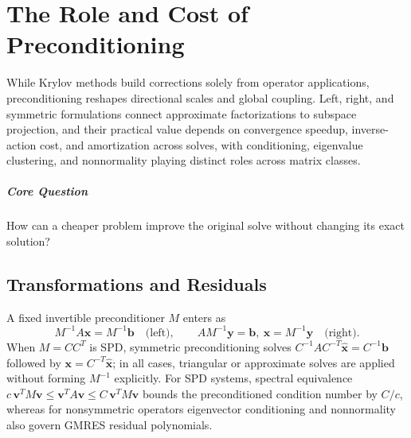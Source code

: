 \chapter{The Role and Cost of Preconditioning}\label{v0ch:16}
\begin{chaptersummary}
While Krylov methods build corrections solely from operator applications, preconditioning reshapes directional scales and global coupling. Left, right, and symmetric formulations connect approximate factorizations to subspace projection, and their practical value depends on convergence speedup, inverse-action cost, and amortization across solves, with conditioning, eigenvalue clustering, and nonnormality playing distinct roles across matrix classes.
\end{chaptersummary}
\paragraph{Core Question}How can a cheaper problem improve the original solve without changing its exact solution?

\section{Transformations and Residuals}
A fixed invertible preconditioner $M$ enters as
\[
 M^{-1}A\bm x=M^{-1}\bm b\quad\text{(left)},\qquad
 AM^{-1}\bm y=\bm b,\ \bm x=M^{-1}\bm y\quad\text{(right)}.
\]
When $M=CC^T$ is SPD, symmetric preconditioning solves
$C^{-1}AC^{-T}\widehat{\bm x}=C^{-1}\bm b$ followed by $\bm x=C^{-T}\widehat{\bm x}$; in all cases, triangular or approximate solves are applied without forming $M^{-1}$ explicitly.
For SPD systems, spectral equivalence
$c\,\bm v^TM\bm v\le\bm v^TA\bm v\le C\,\bm v^TM\bm v$
bounds the preconditioned condition number by $C/c$, whereas for nonsymmetric operators eigenvector conditioning and nonnormality also govern GMRES residual polynomials.
